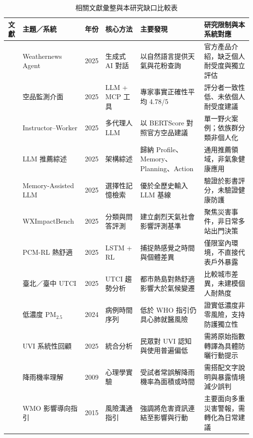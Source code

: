 \documentclass[conference]{IEEEtran}
\begin{document}
\begin{table}[t]
  \centering
  \caption{相關文獻彙整與本研究缺口比較表}
  \label{tab:literature_summary}
  \begin{tabularx}{\textwidth}{@{}c l c l X X@{}}
    \toprule
    \textbf{文獻} & \textbf{主題／系統} & \textbf{年份} & \textbf{核心方法} & \textbf{主要發現} & \textbf{研究限制與本系統對應} \\
    \midrule
    \cite{weathernews2025agent} & Weathernews Agent & 2025 & 生成式 AI 對話 & 以自然語言提供天氣與花粉查詢 & 官方產品介紹，缺乏個人耐受度與獨立評估 \\
    \cite{pan2025mcp_aqi} & 空品監測介面 & 2025 & LLM + MCP 工具 & 專家事實正確性平均 4.78/5 & 評分者一致性低、未依個人耐受度建議 \\
    \cite{gao2025instructor_worker} & Instructor--Worker & 2025 & 多代理人 LLM & 以 BERTScore 對照官方空品建議 & 單一野火案例；依族群分類非個人化 \\
    \cite{peng2025survey_rec_agents} & LLM 推薦綜述 & 2025 & 架構綜述 & 歸納 Profile、Memory、Planning、Action & 通用推薦領域，非氣象健康應用 \\
    \cite{chen2025memory_llm} & Memory-Assisted LLM & 2025 & 選擇性記憶檢索 & 優於全歷史輸入 LLM 基線 & 驗證於影書評分，未驗證健康防護 \\
    \cite{yu2025wximpactbench} & WXImpactBench & 2025 & 分類與問答評測 & 建立劇烈天氣社會影響評測基準 & 聚焦災害事件，非日常多站出門決策 \\
    \cite{abdulraheem2025pcm_rl} & PCM-RL 熱舒適 & 2025 & LSTM + RL & 捕捉熱感覺之時間與個體差異 & 僅限室內環境，不直接代表戶外暴露 \\
    \cite{shih2025taiwan_utci} & 臺北／臺中 UTCI & 2025 & UTCI 趨勢分析 & 都市熱島對熱舒適影響大於氣候變遷 & 比較城市差異，未建模個人耐熱度 \\
    \cite{sun2024low_pm25} & 低濃度 PM$_{2.5}$ & 2024 & 病例時間序列 & 低於 WHO 指引仍具心肺就醫風險 & 證實低濃度非零風險，支持防護獨立性 \\
    \cite{kaiser2025uvi_review} & UVI 系統性回顧 & 2025 & 統合分析 & 民眾對 UVI 認知與使用普遍偏低 & 需將原始指數轉譯為具體防曬行動提示 \\
    \cite{joslyn2009pop} & 降雨機率理解 & 2009 & 心理學實驗 & 受試者常誤解降雨機率為面積或時間 & 需搭配文字說明與暴露情境減少誤判 \\
    \cite{wmo2015impact_forecast} & WMO 影響導向指引 & 2015 & 風險溝通指引 & 強調將危害資訊連結至影響與行動 & 主要面向多重災害警報，需轉化為日常建議 \\
    \bottomrule
  \end{tabularx}
\end{table}
\end{document}
